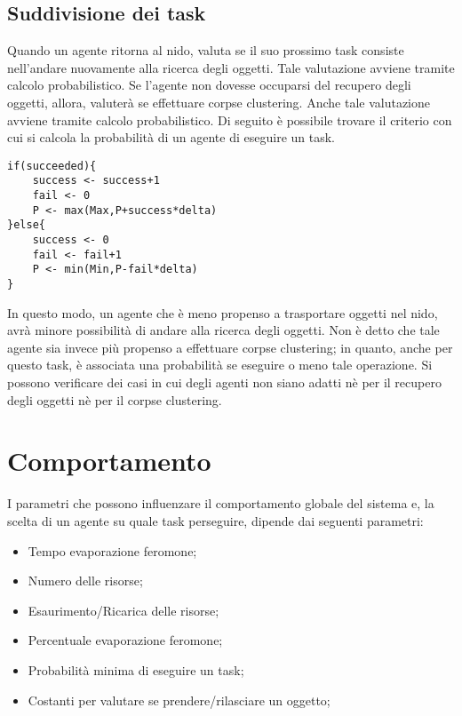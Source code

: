 \documentclass[12pt,a4paper,openright,twoside]{report}
\begin{document}
\section{Suddivisione dei task} 
Quando un agente ritorna al nido, valuta se il suo prossimo task consiste nell'andare nuovamente alla ricerca degli oggetti. Tale valutazione avviene tramite calcolo probabilistico. Se l'agente non dovesse occuparsi del recupero degli oggetti, allora, valuterà se effettuare corpse clustering. Anche tale valutazione avviene tramite calcolo probabilistico. Di seguito è possibile trovare il criterio con cui si calcola la probabilità di un agente di eseguire un task.\\


\begin{verbatim}
if(succeeded){
    success <- success+1
    fail <- 0
    P <- max(Max,P+success*delta)
}else{
    success <- 0
    fail <- fail+1
    P <- min(Min,P-fail*delta)
}
\end{verbatim}

In questo modo, un agente che è meno propenso a trasportare oggetti nel nido, avrà minore possibilità di andare alla ricerca degli oggetti. Non è detto che tale agente sia invece più propenso a effettuare corpse clustering; in quanto, anche per questo task, è associata una probabilità se eseguire o meno tale operazione. Si possono verificare dei casi in cui degli agenti non siano adatti nè per il recupero degli oggetti nè per il corpse clustering.

\clearpage{\pagestyle{empty}\cleardoublepage}
\chapter{Comportamento}                %
\lhead[\fancyplain{}{\bfseries\thepage}]{\fancyplain{}{\bfseries\rightmark}}

I parametri che possono influenzare il comportamento globale del sistema e, la scelta di un agente su quale task perseguire, dipende dai seguenti parametri:\\

\begin{itemize}
	\item Tempo evaporazione feromone;
	\item Numero delle risorse;
	\item Esaurimento/Ricarica delle risorse;
	\item Percentuale evaporazione feromone;
	\item Probabilità minima di eseguire un task;
	\item Costanti per valutare se prendere/rilasciare un oggetto;
\end{itemize}
\end{document}
